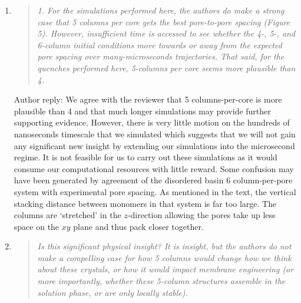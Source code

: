 \documentclass{article}
\begin{document}
\begin{enumerate}
\begin{quote}
	
    \end{quote}
	
    \item \begin{quote}
    \textit{1. For the simulations performed here, the authors do make a strong case that 5 columns per
    core gets the best pore-to-pore spacing (Figure 5). However, insufficient time is accessed to see 
    whether the 4-, 5-, and 6-column initial conditions move towards or away from the expected pore 
    spacing over many-microseconds trajectories. That said, for the quenches performed here, 5-columns
    per core seems more plausible than 4.}
    \end{quote}
	
    Author reply: We agree with the reviewer that 5 columns-per-core is more plausible than 4 and that much
    longer simulations may provide further supporting evidence. However, there is very little motion on
    the hundreds of nanoseconds timescale that we simulated which suggests that we will not gain any 
    significant new insight by extending our simulations into the microsecond regime. It is not feasible 
    for us to carry out these simulations as it would consume our computational resources with little reward.
    Some confusion may have been generated by agreement of the disordered basin 6 column-per-pore system
    with experimental pore spacing. As mentioned in the text, the vertical stacking distance between monomers
    in that system is far too large. The columns are `stretched' in the $z$-direction allowing the pores take
    up less space on the $xy$ plane and thus pack closer together.  
    
    \item \begin{quote}    
    \textit{Is this significant physical insight? It is insight, but the
    authors do not make a compelling case for how 5 columns would change how we think about these crystals,
    or how it would impact membrane engineering (or more importantly, whether these 5-column structures
    assemble in the solution phase, or are only locally stable).}
    \end{quote}
    

\end{enumerate}
\end{document}
